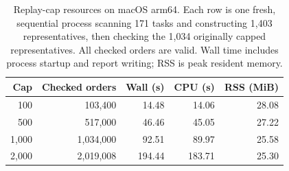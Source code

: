 \begin{table}[t]
\centering\small
\caption{Replay-cap resources on macOS arm64. Each row is one fresh, sequential process scanning 171 tasks and constructing 1,403 representatives, then checking the 1,034 originally capped representatives. All checked orders are valid. Wall time includes process startup and report writing; RSS is peak resident memory.}
\label{tab:cap-resources}
\begin{tabular}{rrrrr}
\toprule
Cap & Checked orders & Wall (s) & CPU (s) & RSS (MiB) \\
\midrule
100 & 103,400 & 14.48 & 14.06 & 28.08 \\
500 & 517,000 & 46.46 & 45.05 & 27.22 \\
1,000 & 1,034,000 & 92.51 & 89.97 & 25.58 \\
2,000 & 2,019,008 & 194.44 & 183.71 & 25.30 \\
\bottomrule
\end{tabular}
\end{table}

